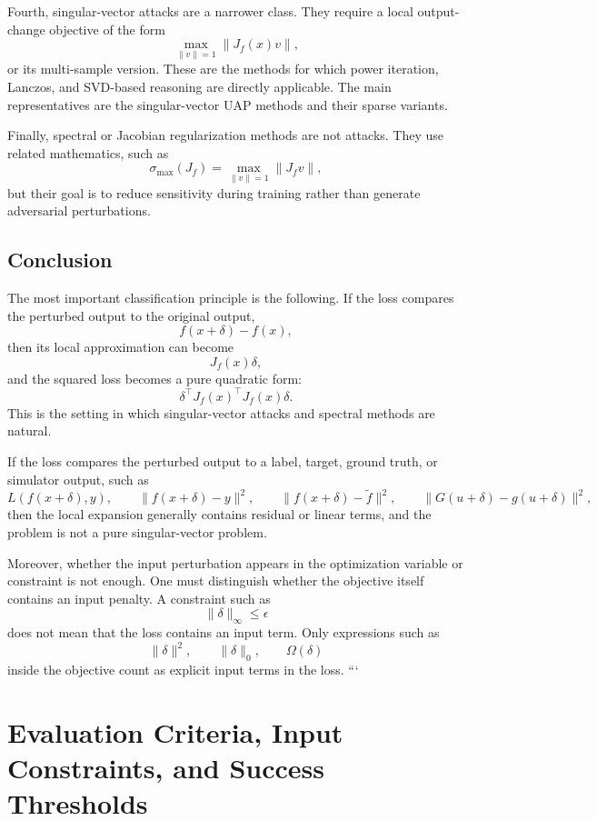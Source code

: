\documentclass{article}
\begin{document}
Fourth, singular-vector attacks are a narrower class. They require a local output-change objective of the form
\[
    \max_{\|v\|=1}
    \|J_f(x)v\|,
\]
or its multi-sample version. These are the methods for which power iteration, Lanczos, and SVD-based reasoning are directly applicable. The main representatives are the singular-vector UAP methods and their sparse variants.

Finally, spectral or Jacobian regularization methods are not attacks. They use related mathematics, such as
\[
    \sigma_{\max}(J_f)
    =
    \max_{\|v\|=1}
    \|J_fv\|,
\]
but their goal is to reduce sensitivity during training rather than generate adversarial perturbations.

\subsection{Conclusion}

The most important classification principle is the following. If the loss compares the perturbed output to the original output,
\[
    f(x+\delta)-f(x),
\]
then its local approximation can become
\[
    J_f(x)\delta,
\]
and the squared loss becomes a pure quadratic form:
\[
    \delta^\top J_f(x)^\top J_f(x)\delta.
\]
This is the setting in which singular-vector attacks and spectral methods are natural.

If the loss compares the perturbed output to a label, target, ground truth, or simulator output, such as
\[
    L(f(x+\delta),y),
    \qquad
    \|f(x+\delta)-y\|^2,
    \qquad
    \|f(x+\delta)-\tilde f\|^2,
    \qquad
    \|G(u+\delta)-g(u+\delta)\|^2,
\]
then the local expansion generally contains residual or linear terms, and the problem is not a pure singular-vector problem.

Moreover, whether the input perturbation appears in the optimization variable or constraint is not enough. One must distinguish whether the objective itself contains an input penalty. A constraint such as
\[
    \|\delta\|_\infty\le \epsilon
\]
does not mean that the loss contains an input term. Only expressions such as
\[
    \|\delta\|^2,
    \qquad
    \|\delta\|_0,
    \qquad
    \Omega(\delta)
\]
inside the objective count as explicit input terms in the loss.
```

\section{Evaluation Criteria, Input Constraints, and Success Thresholds}
\end{document}
